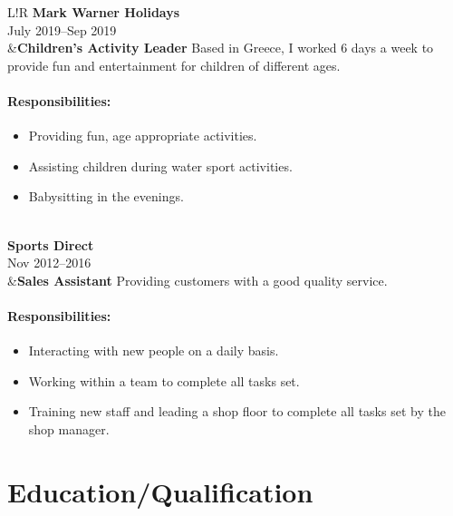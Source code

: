 \documentclass[10pt]{article}
\newcommand\VRule{\color{lightgray}\vrule width 0.5pt}
\begin{document}
\begin{longtable}{L!{\VRule}R}
{\bf Mark Warner Holidays}\\
July 2019--Sep 2019\\
&{\bf Children's Activity Leader}\newline
Based in Greece, I worked 6 days a week to provide fun and entertainment for children of different ages.

\vspace{-3mm}
\paragraph{Responsibilities:}
\begin{itemize}[noitemsep,topsep=0pt]
    \item Providing fun, age appropriate activities.
    \item Assisting children during water sport activities.
    \item Babysitting in the evenings.
\end{itemize}
\\

{\bf Sports Direct}\\
Nov 2012--2016\\
&{\bf Sales Assistant}\newline
Providing customers with a good quality service.

\vspace{-3mm}
\paragraph{Responsibilities:}
\begin{itemize}[noitemsep,topsep=0pt]
    \item Interacting with new people on a daily basis.
    \item Working within a team to complete all tasks set.
    \item Training new staff and leading a shop floor to complete all tasks set by the shop manager.
\end{itemize}
\end{longtable}

\section*{Education/Qualification}
\end{document}
